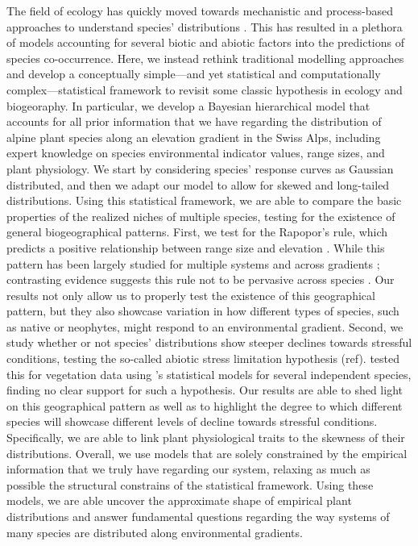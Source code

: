 \documentclass[11pt, a4paper]{article}
\begin{document}

The field of ecology has quickly moved towards mechanistic and process-based approaches to understand species' distributions \citep{wartonManyVariablesJoint2015}. This has resulted in a plethora of models accounting for several biotic and abiotic factors into the predictions of species co-occurrence. Here, we instead rethink traditional modelling approaches and develop a conceptually simple---and yet statistical and computationally complex---statistical framework to revisit some classic hypothesis in ecology and biogeoraphy. In particular, we develop a Bayesian hierarchical model that accounts for all prior information that we have regarding the distribution of alpine plant species along an elevation gradient in the Swiss Alps, including expert knowledge on species environmental indicator values, range sizes, and plant physiology. We start by considering species' response curves as Gaussian distributed, and then we adapt our model to allow for skewed and long-tailed distributions. Using this statistical framework, we are able to compare the basic properties of the realized niches of multiple species, testing for the existence of general biogeographical patterns. First, we test for the Rapopor's rule, which predicts a positive relationship between range size and elevation \citep{stevensElevationalGradientAltitudinal1992}. While this pattern has been largely studied for multiple systems and across gradients \citep{mccainElevationalRapoportRule2013}; contrasting evidence suggests this rule not to be pervasive across species \citep{ribasRapoportEffectWidespread2006, bhattaraiCanRapoportRule2006, mccainElevationalRapoportRule2013}. Our results not only allow us to properly test the existence of this geographical pattern, but they also showcase variation in how different types of species, such as native or neophytes, might respond to an environmental gradient. Second, we study whether or not species' distributions show steeper declines towards stressful conditions, testing the so-called abiotic stress limitation hypothesis (ref). \citet{normandImportanceAbioticStress2009} tested this for vegetation data using \citeauthor{huismanHierarchicalSetModels1993}'s statistical models for several independent species, finding no clear support for such a hypothesis. Our results are able to shed light on this geographical pattern as well as to highlight the degree to which different species will showcase different levels of decline towards stressful conditions. Specifically, we are able to link plant physiological traits to the skewness of their distributions. Overall, we use models that are solely constrained by the empirical information that we truly have regarding our system, relaxing as much as possible the structural constrains of the statistical framework. Using these models, we are able uncover the approximate shape of empirical plant distributions and answer fundamental questions regarding the way systems of many species are distributed along environmental gradients.
\end{document}
